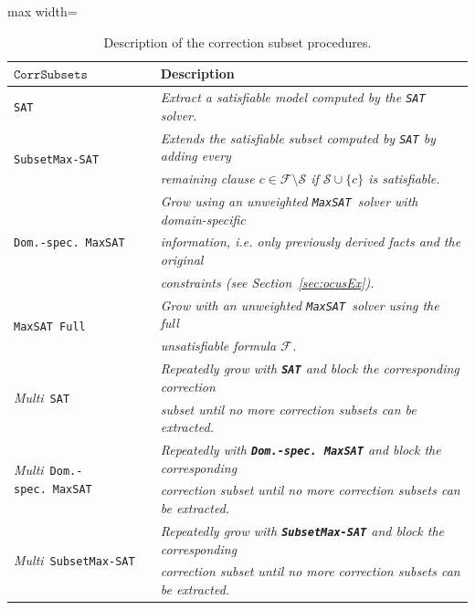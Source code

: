 \documentclass[twoside,11pt]{article}
\newcommand\m[1]{\mathcal{#1}}
\newcommand\formula{\ensuremath{\m{F} }\xspace}
\newcommand\mm[1]{\ensuremath{#1}\xspace}
\newcommand\call[1]{\mm{\texttt{#1}}}
\newcommand\sat{\texttt{{SAT}}\xspace}
\newcommand\subsetmaxsat{\texttt{SubsetMax-SAT}}
\newcommand\corrsubsets{\mm{\call{CorrSubsets}}}
\newcommand\maxsat{\texttt{MaxSAT}}
\newcommand\domspecmaxsat{\texttt{Dom.-spec.}~\texttt{MaxSAT}}
\newcommand\maxsatfull{\texttt{MaxSAT Full}}
\begin{document}
\begin{table}[!h]
	\centering
	\begin{adjustbox}{max width=\textwidth}
		
		\begin{tabular}{|l|l|}
			\hline
			\textbf{\corrsubsets}  &  \textbf{Description}\\\hline
			
			\sat & \textit{Extract a satisfiable model computed by the \sat solver.} \\\hline
			\multirow{2}{*}{\subsetmaxsat} & \textit{Extends the satisfiable subset computed by \sat by adding every} \\
			&			\textit{remaining clause $c \in \formula \setminus \m{S}$ if $\m{S} \cup \{c\}$ is satisfiable.} \\\hline
			\multirow{3}{*}{\domspecmaxsat} & \textit{Grow using an unweighted \maxsat~solver with domain-specific }\\
			&  \textit{information, i.e. only previously derived facts and the original}\\
			&  \textit{constraints (see Section~\ref{sec:ocusEx}).}\\\hline
			\multirow{2}{*}{\maxsatfull} & \textit{Grow with an unweighted \maxsat~solver using the full } \\
			& \textit{unsatisfiable formula $\mathcal{F}$.} \\\hline
			\multirow{2}{*}{\emph{Multi}~\sat}& \textit{Repeatedly grow with \textbf{\sat}  and block the corresponding correction}\\ 
			& \textit{subset until no more correction subsets can be extracted.}\\\hline
			\multirow{2}{*}{\emph{Multi}~\domspecmaxsat}& \textit{Repeatedly with \textbf{\emph{\domspecmaxsat}} and block the corresponding}\\ 
			& \textit{correction subset until no more correction subsets can be extracted.}\\\hline
			\multirow{2}{*}{\emph{Multi}~\subsetmaxsat} &	\textit{Repeatedly grow with \textbf{\emph{\subsetmaxsat}}  and block the corresponding}\\ 
			& \textit{correction subset until no more correction subsets can be extracted.}\\\hline
		\end{tabular}
	\end{adjustbox}
	\caption{Description of the correction subset procedures.}
	\label{tab:correction-subset-proc-description}
\end{table}
\end{document}
